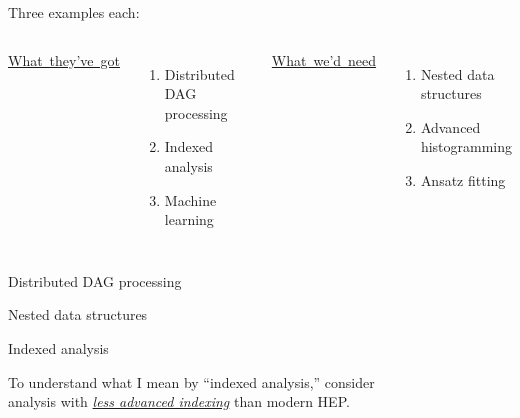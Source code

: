 \documentclass[aspectratio=169]{beamer}
\begin{document}
\begin{frame}{Three examples each:}
\Large
\vspace{0.5 cm}
\begin{columns}[t]
\mbox{\hspace{0.25 cm}\underline{What they've got}}

\vspace{0.25 cm}
\begin{enumerate}
\item Distributed DAG processing
\item Indexed analysis
\item Machine learning
\end{enumerate}

\mbox{\hspace{0.45 cm}\underline{What we'd need}}

\vspace{0.25 cm}
\begin{enumerate}
\item Nested data structures
\item Advanced histogramming
\item Ansatz fitting
\end{enumerate}

\end{columns}
\end{frame}

\begin{frame}{Distributed DAG processing}
\end{frame}

\begin{frame}{Nested data structures}
\end{frame}

\begin{frame}{Indexed analysis}
\Large
\vspace{0.5 cm}
\begin{center}
To understand what I mean by ``indexed analysis,'' consider \\
analysis with \underline{\it less advanced indexing} than modern HEP.
\end{center}
\end{frame}
\end{document}

